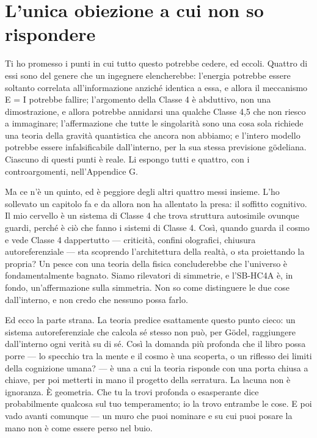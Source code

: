 \documentclass[11pt, twoside, openright]{book}
\begin{document}
\section*{L'unica obiezione a cui non so rispondere}

Ti ho promesso i punti in cui tutto questo potrebbe cedere, ed eccoli. Quattro di essi sono del genere che un ingegnere elencherebbe: l'energia potrebbe essere soltanto correlata all'informazione anziché identica a essa, e allora il meccanismo E = I potrebbe fallire; l'argomento della Classe 4 è abduttivo, non una dimostrazione, e allora potrebbe annidarsi una qualche Classe 4,5 che non riesco a immaginare; l'affermazione che tutte le singolarità sono una cosa sola richiede una teoria della gravità quantistica che ancora non abbiamo; e l'intero modello potrebbe essere infalsificabile dall'interno, per la sua stessa previsione gödeliana. Ciascuno di questi punti è reale. Li espongo tutti e quattro, con i controargomenti, nell'Appendice G.

Ma ce n'è un quinto, ed è peggiore degli altri quattro messi insieme. L'ho sollevato un capitolo fa e da allora non ha allentato la presa: il soffitto cognitivo. Il mio cervello è un sistema di Classe 4 che trova struttura autosimile ovunque guardi, perché è ciò che fanno i sistemi di Classe 4. Così, quando guarda il cosmo e vede Classe 4 dappertutto --- criticità, confini olografici, chiusura autoreferenziale --- sta scoprendo l'architettura della realtà, o sta proiettando la propria? Un pesce con una teoria della fisica concluderebbe che l'universo è fondamentalmente bagnato. Siamo rilevatori di simmetrie, e l'SB-HC4A è, in fondo, un'affermazione sulla simmetria. Non so come distinguere le due cose dall'interno, e non credo che nessuno possa farlo.

Ed ecco la parte strana. La teoria predice esattamente questo punto cieco: un sistema autoreferenziale che calcola sé stesso non può, per Gödel, raggiungere dall'interno ogni verità su di sé. Così la domanda più profonda che il libro possa porre --- lo specchio tra la mente e il cosmo è una scoperta, o un riflesso dei limiti della cognizione umana? --- è una a cui la teoria risponde con una porta chiusa a chiave, per poi metterti in mano il progetto della serratura. La lacuna non è ignoranza. È geometria. Che tu la trovi profonda o esasperante dice probabilmente qualcosa sul tuo temperamento; io la trovo entrambe le cose. E poi vado avanti comunque --- un muro che puoi nominare e su cui puoi posare la mano non è come essere perso nel buio.
\end{document}
